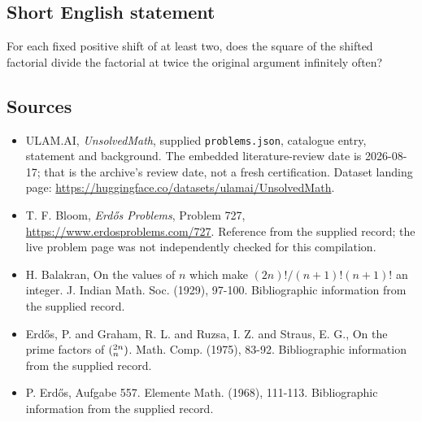 \documentclass[11pt,a4paper]{article}
\begin{document}
\subsection{Short English statement}

For each fixed positive shift of at least two, does the square of the shifted factorial divide the factorial at twice the original argument infinitely often?

\subsection{Sources}

{\small

\begin{itemize}

\item[\hypertarget{source:statement:1}{S1}] ULAM.AI, \emph{UnsolvedMath}, supplied \texttt{problems.json}, catalogue entry, statement and background. The embedded literature-review date is 2026-08-17; that is the archive’s review date, not a fresh certification. Dataset landing page: \url{https://huggingface.co/datasets/ulamai/UnsolvedMath}.

\item[\hypertarget{source:statement:2}{S2}] T. F. Bloom, \emph{Erdős Problems}, Problem 727, \url{https://www.erdosproblems.com/727}. Reference from the supplied record; the live problem page was not independently checked for this compilation.

\item[\hypertarget{source:statement:3}{S3}] H. Balakran, On the values of $n$ which make $(2n)!/(n+1)!(n+1)!$ an integer. J. Indian Math. Soc. (1929), 97-100. Bibliographic information from the supplied record.

\item[\hypertarget{source:statement:4}{S4}] Erd\H{o}s, P. and Graham, R. L. and Ruzsa, I. Z. and Straus, E. G., On the prime factors of $(\sp{2n}\sb{n})$. Math. Comp. (1975), 83-92. Bibliographic information from the supplied record.

\item[\hypertarget{source:statement:5}{S5}] P. Erd\H{o}s, Aufgabe 557. Elemente Math. (1968), 111-113. Bibliographic information from the supplied record.

\end{itemize}

}

\label{end:statement}
\end{document}
